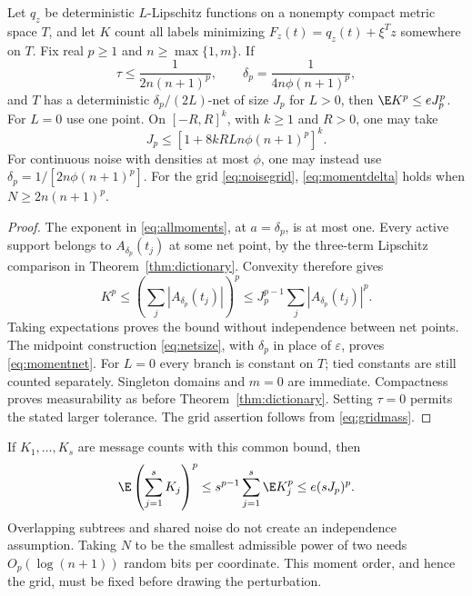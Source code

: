 \begin{theorem}\label{thm:parammoments}
Let $q_z$ be deterministic $L$-Lipschitz functions on a nonempty compact
metric space $T$, and let $K$ count all labels minimizing
$F_z(t)=q_z(t)+\xi^Tz$ somewhere on $T$. Fix real $p\ge1$ and
$n\ge\max\{1,m\}$. If
\begin{equation}\label{eq:momentdelta}
 \tau\le\frac1{2n(n+1)^p},\qquad
 \delta_p=\frac1{4n\phi(n+1)^p},
\end{equation}
and $T$ has a deterministic $\delta_p/(2L)$-net of size $J_p$ for $L>0$,
then $\E K^p\le eJ_p^p$. For $L=0$ use one point. On $[-R,R]^k$,
with $k\ge1$ and $R>0$, one may take
\begin{equation}\label{eq:momentnet}
 J_p\le[1+8kRLn\phi(n+1)^p]^k.
\end{equation}
For continuous noise with densities at most $\phi$, one may instead use
$\delta_p=1/[2n\phi(n+1)^p]$. For the grid \eqref{eq:noisegrid},
\eqref{eq:momentdelta} holds when $N\ge2n(n+1)^p$.
\end{theorem}
\begin{proof}
The exponent in \eqref{eq:allmoments}, at $a=\delta_p$, is at most one.
Every active support belongs to $A_{\delta_p}(t_j)$ at some net point,
by the three-term Lipschitz comparison in Theorem~\ref{thm:dictionary}.
Convexity therefore gives
\[
 K^p\le\left(\sum_j|A_{\delta_p}(t_j)|\right)^p
 \le J_p^{p-1}\sum_j|A_{\delta_p}(t_j)|^p.
\]
Taking expectations proves the bound without independence between net
points. The midpoint construction \eqref{eq:netsize}, with $\delta_p$
in place of $\varepsilon$, proves \eqref{eq:momentnet}. For $L=0$ every
branch is constant on $T$; tied constants are still counted separately.
Singleton domains and $m=0$ are immediate. Compactness proves measurability
as before Theorem~\ref{thm:dictionary}. Setting $\tau=0$ permits the stated
larger tolerance. The grid assertion follows from \eqref{eq:gridmass}.
\end{proof}

If $K_1,\ldots,K_s$ are message counts with this common bound, then
\begin{equation}\label{eq:sum-moments}
 \E\left(\sum_{j=1}^s K_j\right)^p
 \le s^{p-1}\sum_{j=1}^s\E K_j^p\le e(sJ_p)^p.
\end{equation}
Overlapping subtrees and shared noise do not create an independence
assumption. Taking $N$ to be the smallest admissible power of two needs
$O_p(\log(n+1))$ random bits per coordinate. This moment order, and hence
the grid, must be fixed before drawing the perturbation.

